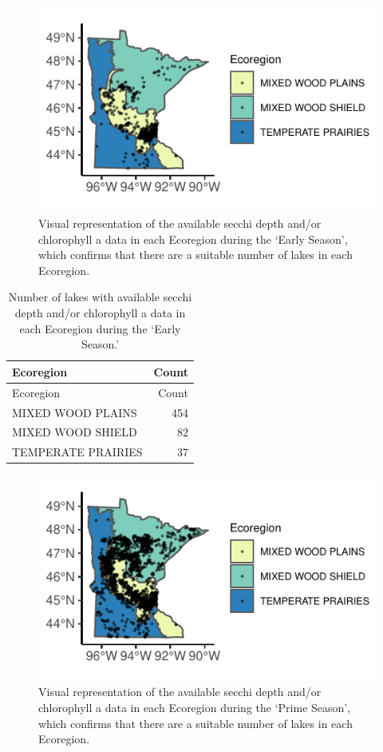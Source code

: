 \documentclass[12pt,]{article}
\begin{document}
\begin{figure}
\centering
\includegraphics{Bollt_Greif_Raby_Roth_Project_Final_files/figure-latex/unnamed-chunk-10-1.pdf}
\caption{Visual representation of the available secchi depth and/or
chlorophyll a data in each Ecoregion during the `Early Season', which
confirms that there are a suitable number of lakes in each Ecoregion.}
\end{figure}

\begin{longtable}[]{@{}lr@{}}
\caption{Number of lakes with available secchi depth and/or chlorophyll
a data in each Ecoregion during the `Early Season.'}\tabularnewline
\toprule
Ecoregion & Count\tabularnewline
\midrule
\endfirsthead
\toprule
Ecoregion & Count\tabularnewline
\midrule
\endhead
MIXED WOOD PLAINS & 454\tabularnewline
MIXED WOOD SHIELD & 82\tabularnewline
TEMPERATE PRAIRIES & 37\tabularnewline
\bottomrule
\end{longtable}

\begin{figure}
\centering
\includegraphics{Bollt_Greif_Raby_Roth_Project_Final_files/figure-latex/unnamed-chunk-12-1.pdf}
\caption{Visual representation of the available secchi depth and/or
chlorophyll a data in each Ecoregion during the `Prime Season', which
confirms that there are a suitable number of lakes in each Ecoregion.}
\end{figure}
\end{document}
